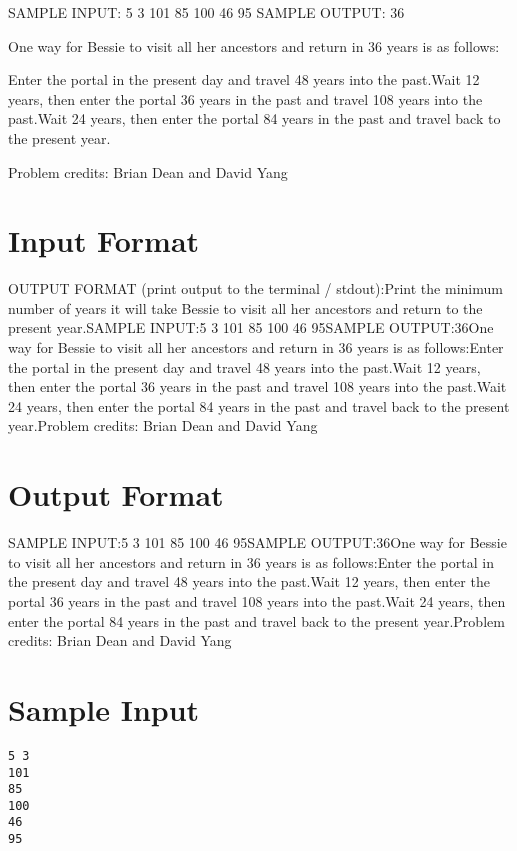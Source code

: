 \documentclass[12pt]{article}
\begin{document}
SAMPLE INPUT:
5 3
101
85
100
46
95
SAMPLE OUTPUT: 
36

One way for Bessie to visit all her ancestors and return in 36 years is as
follows:

Enter the portal in the present day and travel 48 years into the past.Wait 12 years, then enter the portal 36 years in the past and travel 108
years into the past.Wait 24 years, then enter the portal 84 years in the past and travel back to
the present year.

Problem credits: Brian Dean and David Yang



\section*{Input Format}
OUTPUT FORMAT (print output to the terminal / stdout):Print the minimum number of years it will take Bessie to visit all her ancestors
and return to the present year.SAMPLE INPUT:5 3
101
85
100
46
95SAMPLE OUTPUT:36One way for Bessie to visit all her ancestors and return in 36 years is as
follows:Enter the portal in the present day and travel 48 years into the past.Wait 12 years, then enter the portal 36 years in the past and travel 108
years into the past.Wait 24 years, then enter the portal 84 years in the past and travel back to
the present year.Problem credits: Brian Dean and David Yang

\section*{Output Format}
SAMPLE INPUT:5 3
101
85
100
46
95SAMPLE OUTPUT:36One way for Bessie to visit all her ancestors and return in 36 years is as
follows:Enter the portal in the present day and travel 48 years into the past.Wait 12 years, then enter the portal 36 years in the past and travel 108
years into the past.Wait 24 years, then enter the portal 84 years in the past and travel back to
the present year.Problem credits: Brian Dean and David Yang

\section*{Sample Input}
\begin{verbatim}
5 3
101
85
100
46
95
\end{verbatim}
\end{document}
